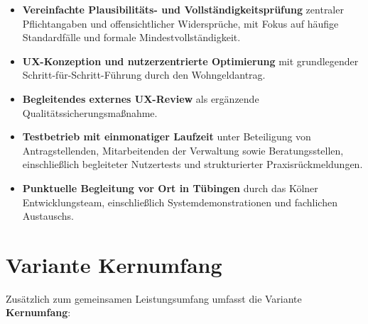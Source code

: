 \documentclass[11pt,a4paper,openany]{report}
\begin{document}
\begin{itemize}
  \item \textbf{Vereinfachte Plausibilitäts- und Vollständigkeitsprüfung} zentraler Pflichtangaben und offensichtlicher Widersprüche, mit Fokus auf häufige Standardfälle und formale Mindestvollständigkeit.
  \item \textbf{UX-Konzeption und nutzerzentrierte Optimierung} mit grundlegender Schritt-für-Schritt-Führung durch den Wohngeldantrag.
  \item \textbf{Begleitendes externes UX-Review} als ergänzende Qualitätssicherungsmaßnahme.
  \item \textbf{Testbetrieb mit einmonatiger Laufzeit} unter Beteiligung von Antragstellenden, Mitarbeitenden der Verwaltung sowie Beratungsstellen, einschließlich begleiteter Nutzertests und strukturierter Praxisrückmeldungen.
  \item \textbf{Punktuelle Begleitung vor Ort in Tübingen} durch das Kölner Entwicklungsteam, einschließlich Systemdemonstrationen und fachlichen Austauschs.
\end{itemize}

\section{Variante \textbf{Kernumfang}}

Zusätzlich zum gemeinsamen Leistungsumfang umfasst die Variante \textbf{Kernumfang}:
\end{document}
